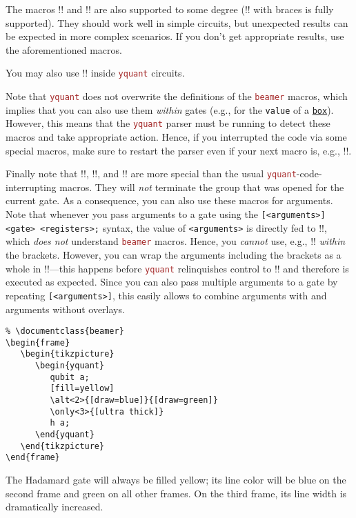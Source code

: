 \documentclass{scrartcl}
\def\pkg#1{\textcolor{brown}{\texttt{#1}}}
\def\gate#1{\hyperref[gate:#1]{\texttt{#1}}}
\def\Yquant{\pkg{yquant}}
\begin{document}
         The macros \tex!\pause! and \tex!\uncover! are also supported to some degree (\tex!\uncover! with braces is fully supported).
         They should work well in simple circuits, but unexpected results can be expected in more complex scenarios.
         If you don't get appropriate results, use the aforementioned macros.

         You may also use \tex!\note! inside \Yquant{} circuits.

         Note that \Yquant{} does not overwrite the definitions of the \pkg{beamer} macros, which implies that you can also use them \emph{within} gates (e.g., for the \texttt{value} of a \gate{box}).
         However, this means that the \Yquant{} parser must be running to detect these macros and take appropriate action.
         Hence, if you interrupted the code via some special macros, make sure to restart the parser even if your next macro is, e.g., \tex!\only!.

         Finally note that \tex!\only!, \tex!\alt!, and \tex!\temporal! are more special than the usual \Yquant\hyp code\hyp interrupting macros.
         They will \emph{not} terminate the group that was opened for the current gate.
         As a consequence, you can also use these macros for arguments.
         Note that whenever you pass arguments to a gate using the \texttt{[<arguments>] <gate> <registers>;} syntax, the value of \texttt{<arguments>} is directly fed to \tex!\pgfkeys!, which \emph{does not} understand \pkg{beamer} macros.
         Hence, you \emph{cannot} use, e.g., \tex!\only! \emph{within} the brackets.
         However, you can wrap the arguments including the brackets as a whole in \tex!\only!---this happens before \Yquant{} relinquishes control to \tex!\pgfkeys! and therefore is executed as expected.
         Since you can also pass multiple arguments to a gate by repeating \texttt{[<arguments>]}, this easily allows to combine arguments with and arguments without overlays.
         \begin{example}
            \begin{verbatim}
% \documentclass{beamer}
\begin{frame}
   \begin{tikzpicture}
      \begin{yquant}
         qubit a;
         [fill=yellow]
         \alt<2>{[draw=blue]}{[draw=green]}
         \only<3>{[ultra thick]}
         h a;
      \end{yquant}
   \end{tikzpicture}
\end{frame}
            \end{verbatim}
            The Hadamard gate will always be filled yellow; its line color will be blue on the second frame and green on all other frames.
            On the third frame, its line width is dramatically increased.
         \end{example}
\end{document}
